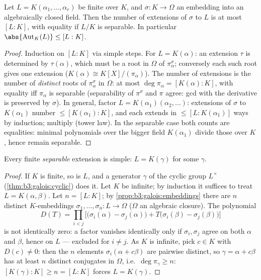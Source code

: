 \begin{proposition}\label{prop:b3:galois:embeddings}
Let $L = K(\alpha_1, \dots, \alpha_r)$ be finite over $K$, and
$\sigma \colon K \to \Omega$ an embedding into an algebraically
closed field. Then the number of extensions of $\sigma$ to $L$
is at most $[L:K]$, with equality if $L/K$ is separable. In
particular $\abs{\operatorname{Aut}_K(L)} \leq [L:K]$.
\end{proposition}

\begin{proof}
Induction on $[L:K]$ via simple steps. For $L = K(\alpha)$: an
extension $\tau$ is determined by $\tau(\alpha)$, which must be a
root in $\Omega$ of $\pi_\alpha^\sigma$; conversely each such
root gives one extension ($K(\alpha) \cong K[X]/(\pi_\alpha)$).
The number of extensions is the number of \emph{distinct} roots
of $\pi_\alpha^\sigma$ in $\Omega$: at most $\deg\pi_\alpha =
[K(\alpha):K]$, with equality iff $\pi_\alpha$ is separable
(separability of $\pi^\sigma$ and $\pi$ agree: gcd with the
derivative is preserved by $\sigma$). In general, factor $L =
K(\alpha_1)(\alpha_2, \dots)$: extensions of $\sigma$ to
$K(\alpha_1)$ number $\leq [K(\alpha_1):K]$, and each extends in
$\leq [L : K(\alpha_1)]$ ways by induction; multiply (tower
law). In the separable case both counts are equalities: minimal
polynomials over the bigger field $K(\alpha_1)$ divide those
over $K$, hence remain separable.
\end{proof}

\begin{theorem}\label{thm:b3:galois:primitive}
Every finite \emph{separable} extension is simple: $L =
K(\gamma)$ for some $\gamma$.
\end{theorem}

\begin{proof}
If $K$ is finite, so is $L$, and a generator $\gamma$ of the
cyclic group $L^\times$ (\cref{thm:b3:galois:cyclic}) does it.
Let $K$ be infinite; by induction it suffices to treat $L =
K(\alpha, \beta)$. Let $n = [L:K]$; by
\cref{prop:b3:galois:embeddings} there are $n$ distinct
$K$-embeddings $\sigma_1, \dots, \sigma_n \colon L \to \Omega$
($\Omega$ an algebraic closure). The polynomial
\[
D(T)=\prod_{i<j}\bigl[\bigl(\sigma_i(\alpha)-\sigma_j(\alpha)
\bigr) + T\bigl(\sigma_i(\beta) - \sigma_j(\beta)\bigr)\bigr]
\]
is not identically zero: a factor vanishes identically only if
$\sigma_i, \sigma_j$ agree on both $\alpha$ and $\beta$, hence on
$L$ --- excluded for $i \neq j$. As $K$ is infinite, pick $c \in
K$ with $D(c) \ne 0$: then the $n$ elements $\sigma_i(\alpha +
c\beta)$ are pairwise distinct, so $\gamma = \alpha + c\beta$
has at least $n$ distinct conjugates in $\Omega$, i.e.\
$\deg \pi_\gamma \geq n$: $[K(\gamma):K] \geq n = [L:K]$ forces
$L = K(\gamma)$.
\end{proof}

